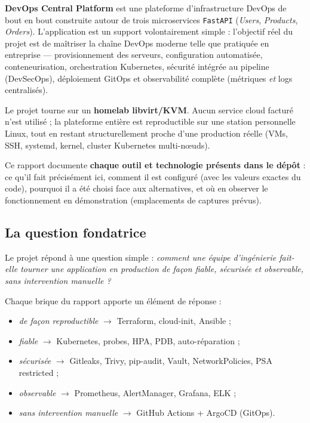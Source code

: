 \documentclass[12pt,a4paper]{article}
\begin{document}
\textbf{DevOps Central Platform} est une plateforme d'infrastructure DevOps de bout en bout construite autour de trois microservices \texttt{FastAPI} (\emph{Users}, \emph{Products}, \emph{Orders}). L'application est un support volontairement simple : l'objectif réel du projet est de maîtriser la chaîne DevOps moderne telle que pratiquée en entreprise --- provisionnement des serveurs, configuration automatisée, conteneurisation, orchestration Kubernetes, sécurité intégrée au pipeline (DevSecOps), déploiement GitOps et observabilité complète (métriques \emph{et} logs centralisés).

Le projet tourne sur un \textbf{homelab libvirt/KVM}. Aucun service cloud facturé n'est utilisé ; la plateforme entière est reproductible sur une station personnelle Linux, tout en restant structurellement proche d'une production réelle (VMs, SSH, systemd, kernel, cluster Kubernetes multi-nœuds).

Ce rapport documente \textbf{chaque outil et technologie présents dans le dépôt} : ce qu'il fait précisément ici, comment il est configuré (avec les valeurs exactes du code), pourquoi il a été choisi face aux alternatives, et où en observer le fonctionnement en démonstration (emplacements de captures prévus).

\subsection{La question fondatrice}
Le projet répond à une question simple : \emph{comment une équipe d'ingénierie fait-elle tourner une application en production de façon fiable, sécurisée et observable, sans intervention manuelle ?}

Chaque brique du rapport apporte un élément de réponse :
\begin{itemize}[itemsep=1pt]
  \item \emph{de façon reproductible} $\rightarrow$ Terraform, cloud-init, Ansible ;
  \item \emph{fiable} $\rightarrow$ Kubernetes, probes, HPA, PDB, auto-réparation ;
  \item \emph{sécurisée} $\rightarrow$ Gitleaks, Trivy, pip-audit, Vault, NetworkPolicies, PSA restricted ;
  \item \emph{observable} $\rightarrow$ Prometheus, AlertManager, Grafana, ELK ;
  \item \emph{sans intervention manuelle} $\rightarrow$ GitHub Actions + ArgoCD (GitOps).
\end{itemize}
\end{document}
